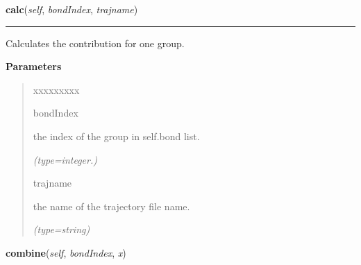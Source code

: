     \label{nMOLDYN:Analysis:NMR:OrderParameter:calc}

    \vspace{0.5ex}

\hspace{.8\funcindent}\begin{boxedminipage}{\funcwidth}

    \raggedright \textbf{calc}(\textit{self}, \textit{bondIndex}, \textit{trajname})

    \vspace{-1.5ex}

    \rule{\textwidth}{0.5\fboxrule}
\setlength{\parskip}{2ex}
    Calculates the contribution for one group.

\setlength{\parskip}{1ex}
      \textbf{Parameters}
      \vspace{-1ex}

      \begin{quote}
        \begin{Ventry}{xxxxxxxxx}

          \item[bondIndex]

          the index of the group in {\textbar}self.bond{\textbar} list.

            {\it (type=integer.)}

          \item[trajname]

          the name of the trajectory file name.

            {\it (type=string)}

        \end{Ventry}

      \end{quote}

    \end{boxedminipage}

    \label{nMOLDYN:Analysis:NMR:OrderParameter:combine}

    \vspace{0.5ex}

\hspace{.8\funcindent}\begin{boxedminipage}{\funcwidth}

    \raggedright \textbf{combine}(\textit{self}, \textit{bondIndex}, \textit{x})

\setlength{\parskip}{2ex}
\setlength{\parskip}{1ex}
    \end{boxedminipage}

